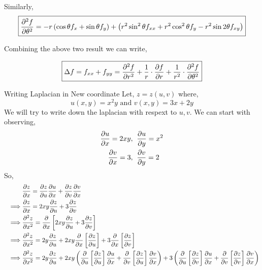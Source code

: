 \documentclass[../Analysis-3.tex]{subfiles}
\begin{document}
Similarly, \[ \boxed{\pdv[2]{f}{\theta} = -r \left( \cos{\theta} f_x + \sin{\theta} f_y \right) + \left( r^2\sin^2 \theta f_{xx} + r^2\cos^2 \theta f_{y} - r^2\sin 2 \theta f_{xy} \right)} \]

Combining the above two result we can write,

\[ \boxed{\Delta f = f_{xx} + f_{yy} = \pdv[2]{f}{r} + \frac{1}{r}\cdot\pdv{f}{r} + \frac{1}{r^2}\cdot\pdv[2]{f}{\theta}} \]

\begin{Eg}{Writing Laplacian in New coordinate}{}
    Let, $z = z(u,v)$ where, \[ u(x,y) = x^2y \text{ and } v(x,y) = 3x + 2y \]
    We will try to write down the laplacian with respext to $u,v$. We can start with observing, \begin{align*}
        \pdv{u}{x} = 2xy, \hspace*{0.2cm} & \pdv{u}{y} = x^2 \\
        \pdv{v}{x} = 3, \hspace*{0.2cm}   & \pdv{v}{y} = 2
    \end{align*}
    So,
    \begin{align*}
        \hspace{1cm} & \pdv{z}{x} = \pdv{z}{u} \pdv{u}{x} + \pdv{z}{v} \pdv{v}{x}                                                                                                                                                                                                  \\
        \implies     & \pdv{z}{x} = 2xy \pdv{z}{u} + 3 \pdv{z}{v}                                                                                                                                                                                                                  \\
        \implies     & \pdv[2]{z}{x} = \pdv{}{x} \left[ 2xy \pdv{z}{u} + 3 \pdv{z}{v} \right]                                                                                                                                                                                      \\
        \implies     & \pdv[2]{z}{x} = 2y \pdv{z}{u} + 2xy \pdv{}{x} \left[\pdv{z}{u}\right]  + 3\pdv{}{x} \left[\pdv{z}{v}\right]                                                                                                                                                 \\
        \implies     & \pdv[2]{z}{x} = 2y \pdv{z}{u} + 2xy \left(\pdv{}{u} \left[\pdv{z}{u}\right] \pdv{u}{x} + \pdv{}{v} \left[\pdv{z}{u}\right] \pdv{v}{x}\right)  + 3\left( \pdv{}{u} \left[\pdv{z}{v}\right] \pdv{u}{x} + \pdv{}{v} \left[\pdv{z}{v}\right] \pdv{v}{x} \right) \\

\end{align*}
\end{Eg}
\end{document}
